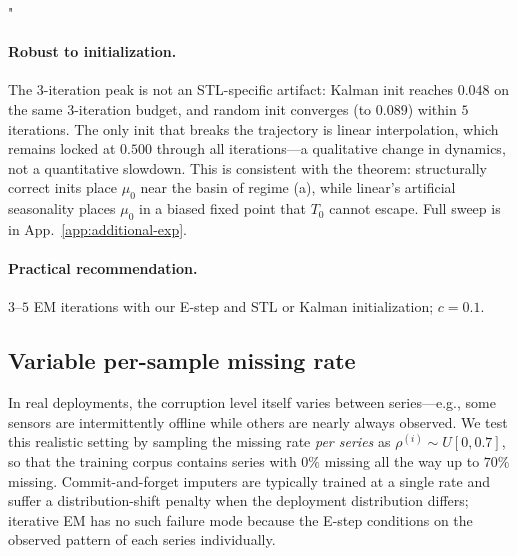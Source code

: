 "\documentclass{article}
\theoremstyle{plain}
\theoremstyle{definition}
\theoremstyle{remark}
\begin{document}
\paragraph{Robust to initialization.}
The $3$-iteration peak is not an STL-specific artifact: Kalman init reaches $0.048$ on the same $3$-iteration budget, and random init converges (to $0.089$) within $5$ iterations. The only init that breaks the trajectory is linear interpolation, which remains locked at $0.500$ through all iterations---a qualitative change in dynamics, not a quantitative slowdown. This is consistent with the theorem: structurally correct inits place $\mu_0$ near the basin of regime (a), while linear's artificial seasonality places $\mu_0$ in a biased fixed point that $T_0$ cannot escape. Full sweep is in App.~\ref{app:additional-exp}.

\paragraph{Practical recommendation.}
$3$--$5$ EM iterations with our E-step and STL or Kalman initialization; $c = 0.1$.

\vspace{-1mm}
\subsection{Variable per-sample missing rate}
\label{sec:multi-rate}
\vspace{-1mm}

In real deployments, the corruption level itself varies between series---e.g., some sensors are intermittently offline while others are nearly always observed. We test this realistic setting by sampling the missing rate \emph{per series} as $\rho^{(i)} \sim U[0, 0.7]$, so that the training corpus contains series with $0\%$ missing all the way up to $70\%$ missing. Commit-and-forget imputers are typically trained at a single rate and suffer a distribution-shift penalty when the deployment distribution differs; iterative EM has no such failure mode because the E-step conditions on the observed pattern of each series individually.
\end{document}
